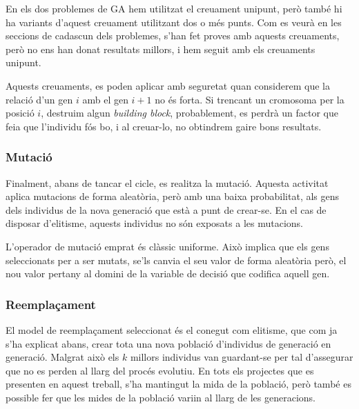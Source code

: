 \documentclass[titlepage,a4paper,12pt]{book}
\begin{document}
En els dos problemes de GA hem utilitzat el creuament unipunt, però també hi
ha variants d'aquest creuament utilitzant dos o més punts.  Com es veurà en les
seccions de cadascun dels problemes, s'han fet proves amb aquests creuaments,
però no ens han donat resultats millors, i hem seguit amb els creuaments
unipunt.

Aquests creuaments, es poden aplicar amb seguretat quan considerem que la
relació d'un gen $i$ amb el gen $i+1$ no és forta.  Si trencant un cromosoma per
la posició $i$, destruim algun \emph{building block}, probablement, es perdrà un
factor que feia que l'individu fós bo, i al creuar-lo, no obtindrem gaire bons
resultats.

\subsubsection{Mutació}

Finalment, abans de tancar el cicle, es realitza la mutació. Aquesta activitat
aplica mutacions de forma aleatòria, però amb una baixa probabilitat, als gens
dels individus de la nova generació que està a punt de crear-se. En el cas de
disposar d'elitisme, aquests individus no són exposats a les mutacions.

L'operador de mutació emprat és clàssic uniforme. Això implica que els gens
seleccionats per a ser mutats, se'ls canvia el seu valor de forma aleatòria
però, el nou valor pertany al domini de la variable de decisió que codifica
aquell gen.

\subsubsection{Reemplaçament}

El model de reemplaçament seleccionat és el conegut com elitisme, que com ja
s'ha explicat abans, crear tota una nova població d'individus de generació en
generació. Malgrat això els $k$ millors individus van guardant-se per tal
d'assegurar que no es perden al llarg del procés evolutiu.  En tots els
projectes que es presenten en aquest treball, s'ha mantingut la mida de la
població, però també es possible fer que les mides de la població variin al
llarg de les generacions.

\end{document}
